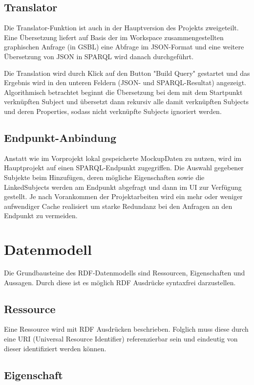 \subsection*{Translator}

Die Translator-Funktion ist auch in der Hauptversion des Projekts
zweigeteilt. Eine Übersetzung liefert auf Basis der im Workspace
zusammengestellten graphischen Anfrage (in GSBL) eine Abfrage im
JSON-Format und eine weitere Übersetzung von JSON in SPARQL wird
danach durchgeführt.

Die Translation wird durch Klick auf den Button "Build Query" gestartet und das Ergebnis wird in den unteren Feldern (JSON- und SPARQL-Resultat) angezeigt.
Algorithmisch betrachtet beginnt die Übersetzung bei dem mit dem
Startpunkt verknüpften Subject und übersetzt dann rekursiv alle damit
verknüpften Subjects und deren Properties, sodass nicht verknüpfte
Subjects ignoriert werden.


\subsection*{Endpunkt-Anbindung}

Anstatt wie im Vorprojekt lokal gespeicherte MockupDaten zu nutzen,
wird im Hauptprojekt auf einen SPARQL-Endpunkt zugegriffen. Die
Auswahl gegebener Subjekte beim Hinzufügen, deren mögliche
Eigenschaften sowie die LinkedSubjects werden am Endpunkt abgefragt
und dann im UI zur Verfügung gestellt. Je nach Vorankommen der
Projektarbeiten wird ein mehr oder weniger aufwendiger Cache
realisiert um starke Redundanz bei den Anfragen an den Endpunkt zu
vermeiden.

\section{Datenmodell}

Die Grundbausteine des RDF-Datenmodells sind Ressourcen, Eigenschaften und Aussagen. Durch diese ist es möglich RDF Ausdrücke syntaxfrei darzustellen.

\subsection*{Ressource}

Eine Ressource wird mit RDF Ausdrücken beschrieben. Folglich muss diese durch eine URI (Universal Resource Identifier) referenzierbar sein und eindeutig von dieser identifiziert werden können.

\subsection*{Eigenschaft}

